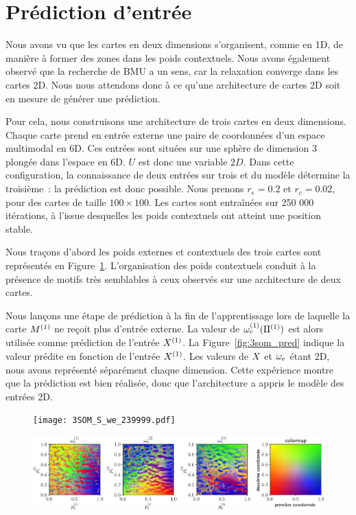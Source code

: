 \documentclass[../main]{subfiles}
\begin{document}
\section{Prédiction d'entrée}

Nous avons vu que les cartes en deux dimensions s'organisent, comme en 1D, de manière à former des zones dans les poids contextuels. 
Nous avons également observé que la recherche de BMU a un sens, car la relaxation converge dans les cartes 2D.
Nous nous attendons donc à ce qu'une architecture de cartes 2D soit en mesure de générer une prédiction.

Pour cela, nous construisons une architecture de trois cartes en deux dimensions. Chaque carte prend en entrée externe une paire de coordonnées d'un espace multimodal en 6D. Ces entrées sont situées sur une sphère de dimension 3 plongée dans l'espace en 6D. $U$ est donc une variable $2D$. 
Dans cette configuration, la connaissance de deux entrées sur trois et du modèle détermine la troisième~: la prédiction est donc possible.
Nous prenons $r_e = 0.2$ et $r_c = 0.02$, pour des cartes de taille $100 \times 100$. Les cartes sont entraînées sur 250 000 itérations, à l'issue desquelles les poids contextuels ont atteint une position stable.


Nous traçons d'abord les poids externes et contextuels des trois cartes sont représentés en Figure~\ref{fig:3som_w}.
L'organisation des poids contextuels conduit à la présence de motifs très semblables à ceux observés sur une architecture de deux cartes.

Nous lançons une étape de prédiction à la fin de l'apprentissage lors de laquelle la carte $M^{({1})}$ ne reçoit plus d'entrée externe. 
La valeur de $\omega_{e}^{({1})}(\Pi^{({1})})$ est alors utilisée comme prédiction de l'entrée $X^{({1})}$.
La Figure~\ref{fig:3som_pred} indique la valeur prédite en fonction de l'entrée $X^{({1})}$. 
Les valeurs de $X$ et $\omega_e$ étant 2D, nous avons représenté séparément chaque dimension. Cette expérience montre que la prédiction est bien réalisée, donc que l'architecture a appris le modèle des entrées 2D.

\begin{figure}
	\begin{minipage}{\textwidth}
		\centering\texttt{[image: 3SOM\_S\_we\_239999.pdf]}
	\end{minipage}
	\begin{minipage}{\textwidth}
		\includegraphics[width=\textwidth]{3SOM_S_wc_239999.pdf}
		\caption{\label{fig:3som_w}}
	\end{minipage}
\end{figure}
\end{document}
